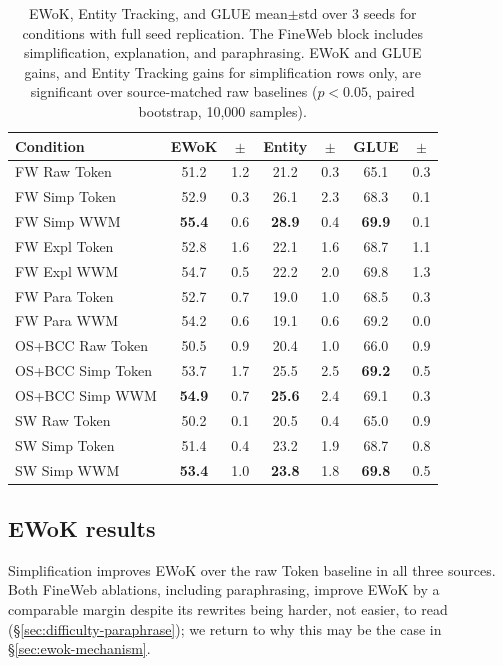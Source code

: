\documentclass[11pt]{article}
\begin{document}
\begin{table}[t]
\centering
\footnotesize
\setlength{\tabcolsep}{2pt}
\begin{tabular}{lcccccc}
\toprule
\textbf{Condition} & \textbf{EWoK} & $\pm$ & \textbf{Entity} & $\pm$ & \textbf{GLUE} & $\pm$ \\
\midrule
FW Raw Token       & 51.2 & 1.2 & 21.2 & 0.3 & 65.1 & 0.3 \\
FW Simp Token      & 52.9 & 0.3 & 26.1 & 2.3 & 68.3 & 0.1 \\
FW Simp WWM        & \textbf{55.4} & 0.6 & \textbf{28.9} & 0.4 & \textbf{69.9} & 0.1 \\
FW Expl Token      & 52.8 & 1.6 & 22.1 & 1.6 & 68.7 & 1.1 \\
FW Expl WWM        & 54.7 & 0.5 & 22.2 & 2.0 & 69.8 & 1.3 \\
FW Para Token      & 52.7 & 0.7 & 19.0 & 1.0 & 68.5 & 0.3 \\
FW Para WWM        & 54.2 & 0.6 & 19.1 & 0.6 & 69.2 & 0.0 \\
\midrule
OS+BCC Raw Token   & 50.5 & 0.9 & 20.4 & 1.0 & 66.0 & 0.9 \\
OS+BCC Simp Token  & 53.7 & 1.7 & 25.5 & 2.5 & \textbf{69.2} & 0.5 \\
OS+BCC Simp WWM    & \textbf{54.9} & 0.7 & \textbf{25.6} & 2.4 & 69.1 & 0.3 \\
\midrule
SW Raw Token       & 50.2 & 0.1 & 20.5 & 0.4 & 65.0 & 0.9 \\
SW Simp Token      & 51.4 & 0.4 & 23.2 & 1.9 & 68.7 & 0.8 \\
SW Simp WWM        & \textbf{53.4} & 1.0 & \textbf{23.8} & 1.8 & \textbf{69.8} & 0.5 \\
\bottomrule
\end{tabular}
\caption{EWoK, Entity Tracking, and GLUE mean$\pm$std over 3 seeds for conditions with full seed replication. The FineWeb block includes simplification, explanation, and paraphrasing. EWoK and GLUE gains, and Entity Tracking gains for simplification rows only, are significant over source-matched raw baselines ($p<0.05$, paired bootstrap, 10{,}000 samples).}
\label{tab:ewok-glue-std}
\end{table}
\subsection{EWoK results}
\label{sec:results-ewok}

Simplification improves EWoK over the raw Token baseline in all three sources.
Both FineWeb ablations, including paraphrasing, improve EWoK by a comparable margin despite its rewrites being harder, not easier, to read (\S\ref{sec:difficulty-paraphrase}); we return to why this may be the case in \S\ref{sec:ewok-mechanism}.
\end{document}
